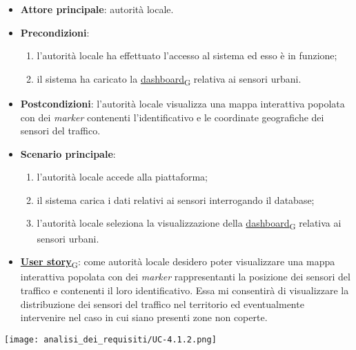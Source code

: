 \begin{itemize}
	\item \textbf{Attore principale}: autorità locale.
	\item \textbf{Precondizioni}:
	      \begin{enumerate}
		      \item l'autorità locale ha effettuato l'accesso al sistema ed esso è in funzione;
		      \item il sistema ha caricato la \href{https://7last.github.io/docs/pb/documentazione-interna/glossario\#dashboard}{dashboard\textsubscript{G}} relativa ai sensori urbani.
	      \end{enumerate}
	\item \textbf{Postcondizioni}: l'autorità locale visualizza una mappa interattiva popolata con dei \textit{marker} contenenti l'identificativo e le coordinate geografiche dei sensori del traffico.
	\item \textbf{Scenario principale}:
	      \begin{enumerate}
		      \item l'autorità locale accede alla piattaforma;
		      \item il sistema carica i dati relativi ai sensori interrogando il database;
		      \item l'autorità locale seleziona la visualizzazione della \href{https://7last.github.io/docs/pb/documentazione-interna/glossario\#dashboard}{dashboard\textsubscript{G}} relativa ai sensori urbani.
	      \end{enumerate}
	\item \href{https://7last.github.io/docs/pb/documentazione-interna/glossario\#user-story}{\textbf{User story}\textsubscript{G}}:
	      come autorità locale desidero poter visualizzare una mappa interattiva popolata con dei \textit{marker} rappresentanti la posizione dei sensori del traffico
	      e contenenti il loro identificativo. Essa mi consentirà di visualizzare la distribuzione dei sensori del traffico nel territorio ed eventualmente intervenire nel caso in cui siano presenti zone non coperte.
\end{itemize}
\begin{center}
	\texttt{[image: analisi\_dei\_requisiti/UC-4.1.2.png]}
\end{center}


